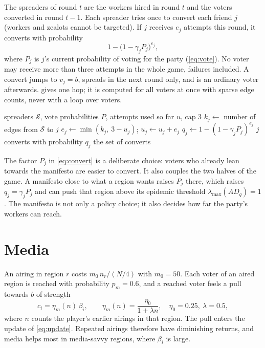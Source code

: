 \documentclass[11pt,a4paper,oneside]{report}
\begin{document}
The spreaders of round $t$ are the workers hired in round $t$ and the voters converted in round $t-1$. Each
spreader tries once to convert each friend $j$ (workers and zealots cannot be targeted). If $j$ receives
$e_j$ attempts this round, it converts with probability
\begin{equation}\label{eq:convert}
  1 - \bigl(1 - \gamma_j P_j\bigr)^{e_j},
\end{equation}
where $P_j$ is $j$'s current probability of voting for the party (\cref{eq:vote}). No voter may receive more
than three attempts in the whole game, failures included. A convert jumps to $v_j = b$, spreads in the next
round only, and is an ordinary voter afterwards.  gives one hop; it is computed for all
voters at once with sparse edge counts, never with a loop over voters.

\begin{algorithm}[t]
\caption{\textsc{CascadeHop}: one round of the worker cascade}\label{alg:cascade}
\begin{algorithmic}[1]
\Require spreaders $\mathcal S$, vote probabilities $P$, attempts used so far $u$, cap $3$
 
  \State $k_j \gets$ number of edges from $\mathcal S$ to $j$
  \State $e_j \gets \min(k_j,\ 3 - u_j)$; \quad $u_j \gets u_j + e_j$
  \State $q_j \gets 1 - (1 - \gamma_j P_j)^{e_j}$
  \State $j$ converts with probability $q_j$
\EndFor
\State \Return the set of converts
\end{algorithmic}
\end{algorithm}

The factor $P_j$ in \cref{eq:convert} is a deliberate choice: voters who already lean towards the manifesto
are easier to convert. It also couples the two halves of the game. A manifesto close to what a region wants
raises $P_j$ there, which raises $q_j = \gamma_j P_j$ and can push that region above its epidemic
threshold $\lambda_{\max}(A D_q) = 1$. The manifesto is not only a policy choice; it also decides how far
the party's workers can reach.

\section{Media}

An airing in region $r$ costs $m_0\, n_r / (N/4)$ with $m_0 = 50$. Each voter of an aired region is reached
with probability $p_m = 0.6$, and a reached voter feels a pull towards $b$ of strength
\begin{equation}
  c_i = \eta_m(n)\,\beta_i, \qquad \eta_m(n) = \frac{\eta_0}{1+\lambda n},\quad \eta_0 = 0.25,\ \lambda = 0.5,
\end{equation}
where $n$ counts the player's earlier airings in that region. The pull enters the update of
\cref{eq:update}. Repeated airings therefore have diminishing returns, and media helps most in media-savvy
regions, where $\beta_i$ is large.
\end{document}
